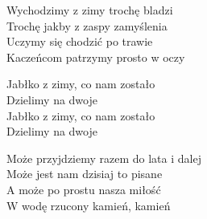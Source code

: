 \begin{text}
    Wychodzimy z zimy trochę bladzi\\
    Trochę jakby z zaspy zamyślenia\\
    Uczymy się chodzić po trawie\\
    Kaczeńcom patrzymy prosto w oczy

    Jabłko z zimy, co nam zostało\\
    Dzielimy na dwoje\\
    Jabłko z zimy, co nam zostało\\
    Dzielimy na dwoje

    Może przyjdziemy razem do lata i dalej\\
    Może jest nam dzisiaj to pisane\\
    A może po prostu nasza miłość\\
    W wodę rzucony kamień, kamień
\end{text}
\begin{chord}

\end{chord}